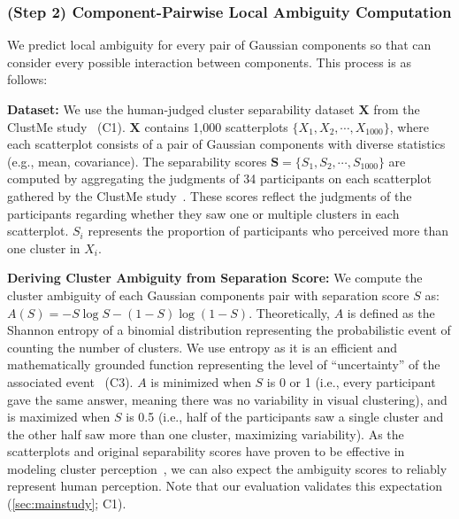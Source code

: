 
\subsubsection*{(Step 2) Component-Pairwise Local Ambiguity Computation}

We 
predict local ambiguity for every pair of Gaussian components so that \measure can consider every possible interaction between 
components. 
This process is as follows: 

\noindent
\textbf{Dataset:}
We use the human-judged cluster separability dataset $\mathbf{X}$ from the ClustMe study~\cite{abbas19cgf} (C1). $\mathbf{X}$ contains 1,000 scatterplots $\{X_1, X_2, \cdots, X_{1000}\}$, where each scatterplot consists of a pair of Gaussian components with diverse statistics (e.g., mean, covariance). 
The separability scores $\mathbf{S} = \{S_1, S_2, \cdots, S_{1000}\}$ are computed by aggregating the judgments of 34 participants on each scatterplot gathered by the ClustMe study~\cite{abbas19cgf}. These scores reflect the judgments of the participants 
 regarding whether they 
saw one or multiple clusters in each scatterplot. 
$S_i$ represents the proportion of participants who perceived more than one cluster in $X_i$. 

\noindent
\textbf{Deriving Cluster Ambiguity from Separation Score:}
We compute the cluster ambiguity of each Gaussian components pair with separation score $S$ 
as: $A(S) = - S \log S - (1-S) \log (1-S)$. Theoretically, $A$ is defined as the Shannon entropy of a binomial distribution representing the probabilistic event of counting the number of clusters. We use entropy as it is an efficient and mathematically grounded function representing the level of ``uncertainty'' of the associated event~\cite{massen88aps}
(C3). 
$A$ is minimized when $S$ is 0 or 1 (i.e., every participant 
gave the same answer, meaning there was no variability in visual clustering), and is maximized when $S$ is 0.5 (i.e., half of the participants saw a single cluster and the other half saw more than one cluster, maximizing variability). 
As the scatterplots and original separability scores have proven to be effective in modeling cluster perception~\cite{abbas19cgf}, we can also expect the ambiguity scores 
to reliably represent human perception. Note that our evaluation validates this expectation (\autoref{sec:mainstudy}; C1). 

